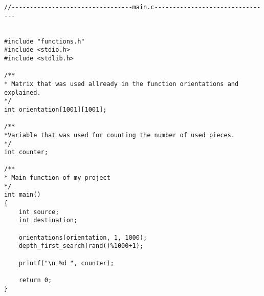 \documentclass[14pt]{article}
\begin{document}
\begin{lstlisting}
//---------------------------------main.c--------------------------------


#include "functions.h"
#include <stdio.h>
#include <stdlib.h>

/**
* Matrix that was used allready in the function orientations and explained.
*/
int orientation[1001][1001];

/**
*Variable that was used for counting the number of used pieces.
*/
int counter;

/**
* Main function of my project
*/
int main()
{
    int source;
    int destination;

    orientations(orientation, 1, 1000);
    depth_first_search(rand()%1000+1);

    printf("\n %d ", counter);

    return 0;
}


\end{lstlisting}

\newpage
\end{document}
